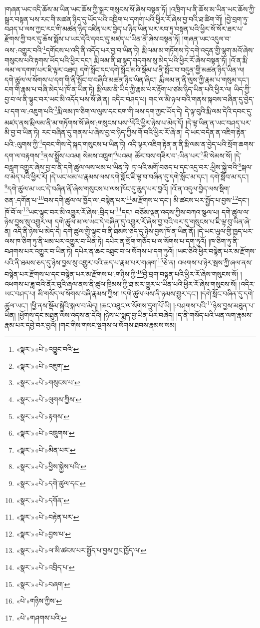 །གཞན་ཡང་འདི་ཆོས་མ་ཡིན་ཡང་ཆོས་ཀྱི་སྒྲར་གསུངས་སོ་ཞེས་བསྟན་ཏོ། །འཁྲིག་པ་ནི་ཆོས་མ་ཡིན་ཡང་ཆོས་ཀྱི་སྒྲར་བསྟན་པས་རང་གི་མཚན་ཉིད་དུ་ཡོད་པའི་འཁྲིག་པ་དགག་པའི་ཕྱིར་རོ་ཞེས་བྱ་བའི་ཐ་ཚིག་གོ། །བྱེ་བྲག་ཏུ་བཤད་པ་ལས་ཀྱང་རང་གི་མཚན་ཉིད་འཛིན་པར་བྱེད་པ་ཉིད་ཡིན་པར་རབ་ཏུ་བསྟན་པའི་ཕྱིར་སོ་སོར་ཐར་པ་རྫོགས་ཀྱི་བར་དུ་ཆོས་སྨོས་པ་ཡང་དེའི་དབང་དུ་མཛད་པ་ཡིན་ནོ་ཞེས་བསྟན་ཏོ། །གཞན་ཡང་འདུལ་བ་ལས་:འགྱུར་བའི་\footnote{«སྣར་»«པེ་»འབྱུང་བའི་}དགོངས་པ་འདི་ནི་འདོད་པར་བྱ་བ་ཡིན་ཏེ། རྨི་ལམ་མ་གཏོགས་ཏེ་དགེ་འདུན་གྱི་ལྷག་མའོ་ཞེས་གསུངས་པའི་རྟགས་ཡོད་པའི་ཕྱིར་དང་། རྨི་ལམ་ནི་ཐ་སྙད་གདགས་སུ་མེད་པའི་ཕྱིར་རོ་ཞེས་བསྟན་ཏོ། །འོ་ན་རྨི་ལམ་ལ་དགག་པར་ཇི་ལྟར་འཐད། དགེ་སློང་དང་དགེ་སློང་མའི་སྡོམ་པ་ནི་སྤོང་བ་བདུན་གྱི་མཚན་ཉིད་ཡིན་ལ། དགེ་ཚུལ་ལ་སོགས་པ་དག་གི་ནི་སྤོང་བ་བཞིའི་མཚན་ཉིད་ཡིན་ཞིང་། རྨི་ལམ་ན་ནི་ལུས་ཀྱི་རྣམ་པ་གསུམ་དང་། ངག་གི་རྣམ་པ་བཞི་མེད་པ་ཁོ་ན་ཡིན་ཏེ། རྨི་ལམ་ནི་ཡིད་ཀྱི་རྣམ་པར་རྟོག་པ་ཙམ་ཉིད་ཡིན་པའི་ཕྱིར་ལ། ཡིད་ཀྱི་བྱ་བ་ལ་ནི་ལྟུང་བར་ཡང་མི་འདོད་པས་སོ་ཞེ་ན། འདིར་བཤད་པ། གང་ལ་མི་ཉལ་བའི་གནས་སྐབས་བཞིན་དུ་བྱེད་པ་དག་ལ་:འཇུག་པའི་\footnote{«སྣར་»«པེ་»འཇུག་}རྨི་ལམ་ཁ་ཅིག་ལ་ལུས་དང་ངག་གི་ལས་དག་ཀྱང་ཡོད་དེ། དེ་ལྟ་བུའི་རྨི་ལམ་དེའི་དབང་དུ་མཛད་ནས་རྨི་ལམ་ནི་མ་གཏོགས་སོ་ཞེས་:གསུངས་པས་\footnote{«སྣར་»«པེ་»གསུངས་པ་}དེའི་ཕྱིར་ཉེས་པ་མེད་དོ། །དེ་ལྟ་ཡིན་ན་ཡང་བཤད་པར་མི་བྱ་བ་ཡིན་ཏེ། རང་བཞིན་དུ་གནས་པ་ཞེས་བྱ་བ་ཉིད་ཀྱིས་གོ་བའི་ཕྱིར་རོ་ཞེ་ན། དེ་ཡང་བདེན་ན་འཇིག་རྟེན་པའི་:ལུགས་ཀྱི་\footnote{«སྣར་»«པེ་»ལུགས་ཀྱིས་}དབང་གིས་དེ་སྐད་གསུངས་པ་ཡིན་ཏེ། འདི་ལྟར་འཇིག་རྟེན་ན་ནི་རྨི་ལམ་ན་བྱེད་པའི་སྲོག་ཆགས་དག་ལ་བརྟགས་\footnote{«སྣར་»«པེ་»རྟགས་}ནས་སྨྱོས་པའམ། སེམས་འཁྲུག་\footnote{«སྣར་»«པེ་»འཁྲུགས་}པའམ། ཚོར་བས་གཟིར་བ་:ཡིན་པར་\footnote{«སྣར་»«པེ་»མིན་པར་}མི་སེམས་སོ། །དེ་བརླག་འགྱུར་ཞེས་བྱ་བ་ནི་དགེ་ཚུལ་ལས་ཕམ་པ་ཡིན་ཏེ། ཏ་ལའི་མགོ་བཅད་པ་དང་འདྲ་བར་:ཕྱིས་སྐྱེ་བའི་\footnote{«སྣར་»«པེ་»ཕྱིས་སྐྱེས་པའི་}སྐལ་བ་མེད་པའི་ཕྱིར་རོ། །དེ་ཡང་ཕམ་པ་རྣམས་ལས་དགེ་སློང་ཇི་ལྟ་བ་བཞིན་དུ་དགེ་སློང་མ་དང་། དགེ་སློབ་མ་དང་། \footnote{«སྣར་»«པེ་»དགེ་ཚུལ་དང་}དགེ་ཚུལ་མ་ཡང་དེ་བཞིན་ནོ་ཞེས་གསུངས་པ་ལས་ཁོང་དུ་ཆུད་པར་བྱའོ། །འོ་ན་འདུལ་བྱེད་ལས་སྡིག་ཅན་:དགོན་པ་\footnote{«སྣར་»«པེ་»དགོན་}བས་དགེ་ཚུལ་ལ་ཁྱོད་ལ་:བསྙེན་པར་\footnote{«སྣར་»«པེ་»བརྟེན་པར་}མ་རྫོགས་པ་དང་། མི་ཚངས་པར་སྤྱོད་པ་བྱས་\footnote{«སྣར་»«པེ་»བྱས་པ་}དང་། ཁོ་བོ་ལ་\footnote{«སྣར་»«པེ་»ལ་མི་ཚངས་པར་སྤྱོད་པ་བྱས་ཀྱང་ཁྱོད་ལ་}ཡང་ལྟུང་བར་མི་འགྱུར་རོ་ཞེས་:བྲིད་པ་\footnote{«སྣར་»«པེ་»འབྲིད་པ་}དང་། བཅོམ་ལྡན་འདས་ཀྱིས་བཀའ་སྩལ་པ། དགེ་ཚུལ་ལ་ཉེས་བྱས་སུ་འགྱུར་ལ། དགེ་ཚུལ་མ་ལ་ཡང་དེ་བཞིན་དུ་འགྱུར་རོ་ཞེས་བྱ་བའི་བར་དུ་གསུངས་པ་ཇི་ལྟ་བུ་ཡིན་ཞེ་ན། འདི་ནི་ཉེས་པ་མེད་དེ། དགེ་ཚུལ་གྱི་ལྟུང་བ་ནི་ཐམས་ཅད་དུ་ཉེས་བྱས་ཁོ་ན་ཡིན་ནོ། །དེ་ཡང་ཡུལ་གྱི་ཁྱད་པར་ལས་ཁ་ཅིག་ཏུ་ནི་ཕམ་པར་འགྱུར་བ་ཡིན་ཏེ། དཔེར་ན་སྲོག་གཅོད་པ་ལ་སོགས་པ་དག་ཏུའོ། །ཁ་ཅིག་ཏུ་ནི་བཤགས་པར་འགྱུར་བ་ཡིན་ཏེ། དཔེར་ན་ཆང་འཐུང་བ་ལ་སོགས་པ་དག་ཏུའོ། །ཡང་ཅིའི་ཕྱིར་བསྙེན་པར་མ་རྫོགས་པའི་ནི་ཐམས་ཅད་དུ་ཉེས་བྱས་སུ་འགྱུར་བའི་ཆད་པ་རྣམ་པར་གཞག་\footnote{«སྣར་»«པེ་»བཞག་}ཅེ་ན། འཕགས་པ་ཉེར་སྦས་ཀྱི་ཞལ་ནས་བསྙེན་པར་རྫོགས་པ་དང་བསྙེན་པར་མ་རྫོགས་པ་:གཉིས་ཀྱི་\footnote{«པེ་»གཉིས་ཀྱིས་}བྱེ་བྲག་བསྟན་པའི་ཕྱིར་རོ་ཞེས་གསུངས་སོ། །འཕགས་པ་ཟླ་བའི་ནོར་བུའི་ཞལ་ནས་ནི་ཚུལ་ཁྲིམས་ཀྱི་ཐ་མར་གྱུར་པ་ཡིན་པའི་ཕྱིར་རོ་ཞེས་གསུངས་སོ། །འདིར་ཡང་བཤད་པ། མི་གསོད་ལ་སོགས་བཞི་རྣམས་ཀྱིས། །དགེ་ཚུལ་ལས་ནི་ཉམས་གྱུར་དང་། །དགེ་སློང་བཞིན་དུ་དགེ་ཚུལ་ཡང་། །ཕྱི་ནས་སྡོམ་སྐྱེའི་སྐལ་བ་མེད། །ཆང་འཐུང་ལ་སོགས་དྲུག་པོ་ཡི། །:བཤགས་པའི་\footnote{«པེ་»གཤགས་པའི་}ཉེས་བྱས་མཐུན་པ་ཡིན། །ཕྱོགས་དང་མཐུན་ལས་འདས་ན་དེའི། །ཉེས་པ་སྨད་བྱ་ཡིན་པར་བཞེད། །ད་ནི་གསོད་པའི་ཡན་ལག་རྣམས་རྣམ་པར་དབྱེ་བར་བྱའོ། །གང་གིས་གསང་སྔགས་ལ་སོགས་ཐབས་རྣམས་སམ། 